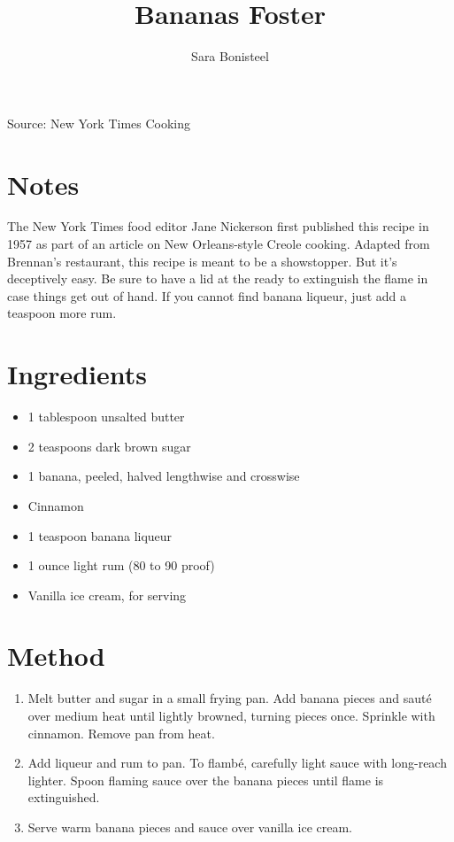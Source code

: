 \documentclass[12pt]{article}
\author{Sara Bonisteel}
\title{Bananas Foster}
\date{}
\begin{document}
\begin{multicols*}{2}
\maketitle

Source: New York Times Cooking

\section{Notes}

The New York Times food editor Jane Nickerson first published this recipe in 1957 as part of an article on New Orleans-style Creole cooking. Adapted from Brennan's restaurant, this recipe is meant to be a showstopper. But it's deceptively easy. Be sure to have a lid at the ready to extinguish the flame in case things get out of hand. If you cannot find banana liqueur, just add a teaspoon more rum.

\section{Ingredients}

\begin{itemize}
    \item 1 tablespoon unsalted butter
    \item 2 teaspoons dark brown sugar
    \item 1 banana, peeled, halved lengthwise and crosswise
    \item Cinnamon
    \item 1 teaspoon banana liqueur
    \item 1 ounce light rum (80­ to 90 ­proof)
    \item Vanilla ice cream, for serving
\end{itemize}

\section{Method}

\begin{enumerate}
    \item Melt butter and sugar in a small frying pan. Add banana pieces and sauté over medium heat until lightly browned, turning pieces once. Sprinkle with cinnamon. Remove pan from heat.
    \item Add liqueur and rum to pan. To flambé, carefully light sauce with long-reach lighter. Spoon flaming sauce over the banana pieces until flame is extinguished.
    \item Serve warm banana pieces and sauce over vanilla ice cream.
\end{enumerate}

\end{multicols*}
\end{document}
